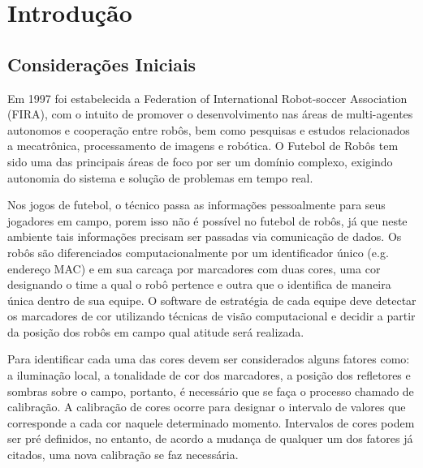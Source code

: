 \chapter{Introdução} \label{Cap:Introducao}
\section{Considerações Iniciais}
Em 1997 foi estabelecida a Federation of International Robot-soccer Association (FIRA), com o intuito de promover o desenvolvimento nas áreas de multi-agentes autonomos e cooperação entre robôs, bem como pesquisas e estudos relacionados a mecatrônica, processamento de imagens e robótica\cite{FiraHistory,FiraOverview}. O Futebol de Robôs tem sido  uma das principais áreas de foco por ser um domínio complexo, exigindo autonomia do sistema e solução de problemas em tempo real\cite{Costa:2000,Faria2006}. 

Nos jogos de futebol, o técnico passa as informações pessoalmente para seus jogadores em campo, porem isso não é possível no futebol de robôs, já que neste ambiente tais informações precisam ser passadas via comunicação de dados.%
Os robôs são diferenciados computacionalmente por um identificador único (e.g. endereço MAC) e em sua carcaça por marcadores com duas cores, uma cor designando o time a qual o robô pertence e outra que o identifica de maneira única dentro de sua equipe. O software de estratégia de cada equipe deve detectar os marcadores de cor utilizando técnicas de visão computacional e decidir a partir da posição dos robôs em campo qual atitude será realizada.

Para identificar cada uma das cores devem ser considerados alguns fatores como: a iluminação local, a tonalidade de cor dos marcadores, a posição dos refletores e sombras sobre o campo, portanto, é necessário que se faça o processo chamado de calibração. A calibração de cores ocorre para designar o intervalo de valores que corresponde a cada cor naquele determinado momento. Intervalos de cores podem ser pré definidos, no entanto, de acordo a mudança de qualquer um dos fatores já citados, uma nova calibração se faz necessária.

